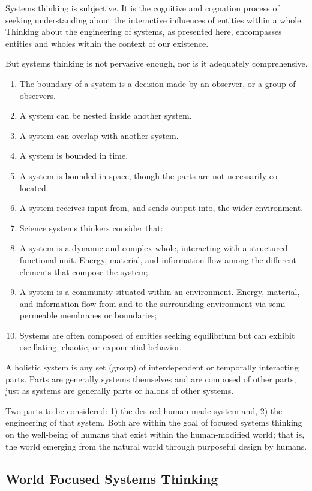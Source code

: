 Systems thinking is subjective. It is the cognitive and cognation process of seeking understanding about the interactive influences of entities within a whole. Thinking about the engineering of systems, as presented here, encompasses entities and wholes within the context of our existence.

But systems thinking is not pervasive enough, nor is it adequately comprehensive. 

\begin{enumerate}
\item The boundary of a system is a decision made by an observer, or a group of observers.
\item A system can be nested inside another system.
\item A system can overlap with another system.
\item A system is bounded in time.
\item A system is bounded in space, though the parts are not necessarily co-located.
\item A system receives input from, and sends output into, the wider environment.
\item Science systems thinkers consider that:
\item A system is a dynamic and complex whole, interacting with a structured functional unit. Energy, material, and information flow among the different elements that compose the system;
\item A system is a community situated within an environment. Energy, material, and information flow from and to the surrounding environment via semi-permeable membranes or boundaries;
\item Systems are often composed of entities seeking equilibrium but can exhibit oscillating, chaotic, or exponential behavior.
\end{enumerate}

A holistic system is any set (group) of interdependent or temporally interacting parts. Parts are generally systems themselves and are composed of other parts, just as systems are generally parts or halons of other systems.

Two parts to be considered: 1) the desired human-made system and, 2) the engineering of that system. Both are within the goal of focused systems thinking on the well-being of humans that exist within the human-modified world; that is, the world emerging from the natural world through purposeful design by humans.

\subsection{World Focused Systems Thinking}

